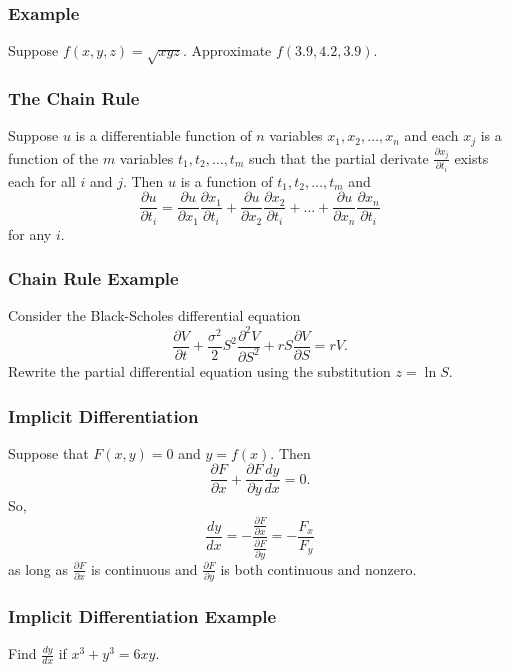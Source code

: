 \documentclass{beamer}
\begin{document}
\begin{frame}[t]
\frametitle{Example}
\begin{Example}
Suppose $f(x, y, z) = \sqrt{xyz}$. Approximate $f(3.9, 4.2, 3.9)$.
\end{Example}

\end{frame}

\begin{frame}
\frametitle{The Chain Rule}

Suppose $u$ is a differentiable function of $n$ variables $x_1, x_2,\ldots, x_n$ and each $x_j$ is a function of the $m$ variables $t_1, t_2,\ldots, t_m$ such that the partial derivate $\frac{\partial x_j}{\partial t_i}$ exists each for all $i$ and $j$. Then $u$ is a function of $t_1, t_2,\ldots, t_m$ and
$$
\frac{\partial u}{\partial t_i} = \frac{\partial u}{\partial x_1}\frac{\partial x_1}{\partial t_i} + \frac{\partial u}{\partial x_2}\frac{\partial x_2}{\partial t_i} + \ldots + \frac{\partial u}{\partial x_n}\frac{\partial x_n}{\partial t_i}
$$
for any $i$.

\end{frame}

\begin{frame}[t]
\frametitle{Chain Rule Example}
\begin{Example}
Consider the Black-Scholes differential equation
$$
\frac{\partial V}{\partial t} + \frac{\sigma^2}{2} S^2 \frac{\partial^2 V}{\partial S^2} + r S \frac{\partial V}{\partial S} = r V.
$$
Rewrite the partial differential equation using the substitution $z = \ln S$.
\end{Example}

\end{frame}

\begin{frame}
\frametitle{Implicit Differentiation}
Suppose that $F(x, y) = 0$ and $y = f(x)$. Then
$$
\frac{\partial F}{\partial x} + \frac{\partial F}{\partial y} \frac{d y}{d x} = 0.
$$
So,
$$
\frac{dy}{dx} = -\frac{\frac{\partial F}{\partial x}}{\frac{\partial F}{\partial y}}= - \frac{F_x}{F_y}
$$
as long as $\frac{\partial F}{\partial x}$ is continuous and $\frac{\partial F}{\partial y}$ is both continuous and nonzero.
\end{frame}

\begin{frame}[t]
\frametitle{Implicit Differentiation Example}
\begin{Example}
Find $\frac{dy}{dx}$ if $x^3 + y^3 = 6xy$.
\end{Example}
\end{frame}
\end{document}
